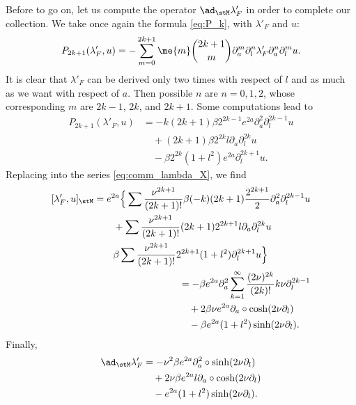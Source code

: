 Before to go on, let us compute the operator $\ad_{\stM}\lambda'_F$ in order to complete our collection. We take once again the formula \eqref{eq:P_k}, with $\lambda'_F$ and $u$:
\begin{equation}
   P_{2k+1}(\lambda'_F,u)=-\sum_{m=0}^{2k+1}\me{m}\binom{2k+1}{m}\partial_a^m\partial_l^n\lambda'_F
                                                                \partial_a^n\partial_l^m u.
\end{equation}
It is clear that $\lambda'_F$ can be derived  only two times with respect of $l$ and as much as we want with respect of $a$. Then possible $n$ are $n=0,1,2$, whose corresponding $m$ are $2k-1$, $2k$, and $2k+1$. Some computations lead to
\begin{equation}
\begin{split}
    P_{2k+1}(\lambda'_F,u)&=-k(2k+1)\beta 2^{2k-1}e^{2a}\partial_a^2\partial_l^{2k-1}u\\
                    &\quad +(2k+1)\beta 2^{2k}l\partial_a\partial_l^{2k}u\\
                    &\quad -\beta 2^{2k}(1+l^2)e^{2a}\partial_l^{2k+1}u.
\end{split}
\end{equation}
Replacing into the series \eqref{eq:comm_lambda_X}, we find
\begin{align*}
\begin{split}
[\lambda'_F,u]_{\stM}&=e^{2a}\Big\{
   \sum\frac{\nu^{2k+1}}{(2k+1)!}\beta (-k)(2k+1)\frac{2^{2k+1}}{2}
                     \partial_a^2\partial_l^{2k-1}u\\
 &\qquad+\sum\frac{\nu^{2k+1}}{(2k+1)!}(2k+1)2^{2k+1}l\partial_a\partial_l^{2k}u\\
 &\qquad\beta\sum\frac{\nu^{2k+1}}{(2k+1)!}2^{2k+1}(1+l^2)\partial_l^{2k+1}u\Big\}
\end{split}\\
\begin{split}
 &=-\beta e^{2a}\partial_a^2\sum_{k=1}^{\infty}\frac{(2\nu)^{2k}}{(2k)!}k\nu\partial_l^{2k-1}\\
 &\quad+2\beta\nu e^{2a}\partial_a\circ\cosh(2\nu\partial_l)\\
 &\quad-\beta e^{2a}(1+l^2)\sinh(2\nu\partial_l).
\end{split}
\end{align*}
Finally,
\begin{equation}
\begin{split}
   \ad_{\stM}\lambda'_F&=-\nu^2\beta e^{2a}\partial_a^2\circ\sinh(2\nu\partial_l)\\
                     &\quad+2\nu\beta e^{2a}l\partial_a\circ\cosh(2\nu\partial_l)\\
             &\quad-e^{2a}(1+l^2)\sinh(2\nu\partial_l).
\end{split}
\end{equation}

